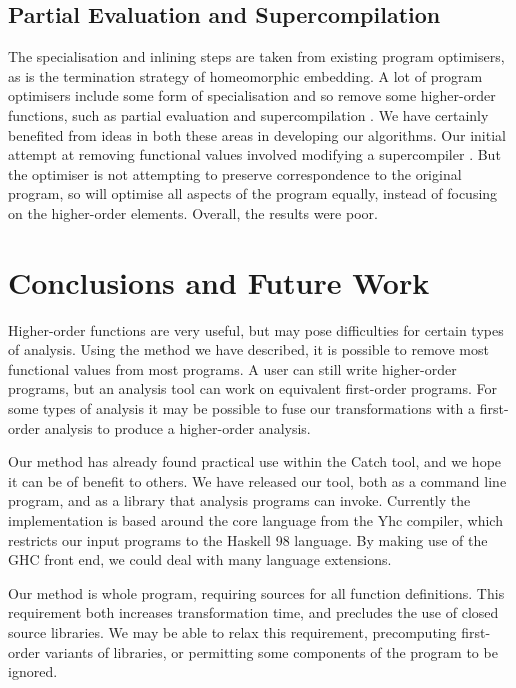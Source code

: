 \documentclass[preprint]{sigplanconf}
\begin{document}
\subsection{Partial Evaluation and Supercompilation}

The specialisation and inlining steps are taken from existing program optimisers, as is the termination strategy of homeomorphic embedding. A lot of program optimisers include some form of specialisation and so remove some higher-order functions, such as partial evaluation \cite{jones:partial_evaluation} and supercompilation \cite{supercompilation}. We have certainly benefited from ideas in both these areas in developing our algorithms. Our initial attempt at removing functional values involved modifying a supercompiler \cite{me:supero}. But the optimiser is not attempting to preserve correspondence to the original program, so will optimise all aspects of the program equally, instead of focusing on the higher-order elements. Overall, the results were poor.

\section{Conclusions and Future Work}
\label{sec:conclusion}

Higher-order functions are very useful, but may pose difficulties for certain types of analysis. Using the method we have described, it is possible to remove most functional values from most programs. A user can still write higher-order programs, but an analysis tool can work on equivalent first-order programs. For some types of analysis it may be possible to fuse our transformations with a first-order analysis to produce a higher-order analysis.

Our method has already found practical use within the Catch tool, and we hope it can be of benefit to others. We have released our tool, both as a command line program, and as a library that analysis programs can invoke. Currently the implementation is based around the core language from the Yhc compiler, which restricts our input programs to the Haskell 98 language. By making use of the GHC front end, we could deal with many language extensions.

Our method is whole program, requiring sources for all function definitions. This requirement both increases transformation time, and precludes the use of closed source libraries. We may be able to relax this requirement, precomputing first-order variants of libraries, or permitting some components of the program to be ignored.
\end{document}
